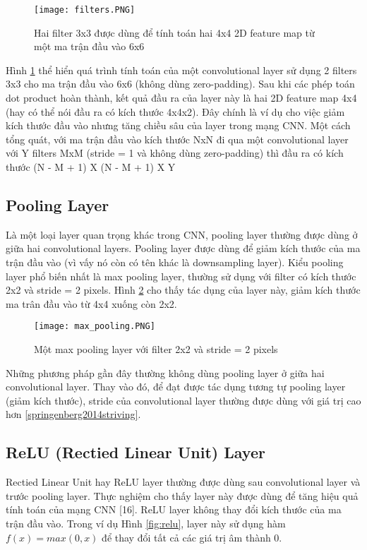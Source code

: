 \begin{figure}[h!]
	\centering
	\captionsetup{width=0.7\textwidth}
	\texttt{[image: filters.PNG]}
	\caption{Hai filter 3x3 được dùng để tính toán hai 4x4 2D feature map từ một ma trận đầu vào 6x6}
    \label{fig:filters}
\end{figure}

Hình \ref{fig:filters} thể hiển quá trình tính toán của một convolutional layer sử dụng 2 filters 3x3 cho ma trận đầu vào 6x6 (không dùng zero-padding). Sau khi các phép toán dot product hoàn thành, kết quả đầu ra của layer này là hai 2D feature map 4x4 (hay có thể nói đầu ra có kích thước 4x4x2). Đây chính là ví dụ cho việc giảm kích thước đầu vào nhưng tăng chiều sâu của layer trong mạng CNN. Một cách tổng quát, với ma trận đầu vào kích thước NxN đi qua một convolutional layer với Y filters MxM (stride = 1 và không dùng zero-padding) thì đầu ra có kích thước (N - M + 1) X (N - M + 1) X Y

\subsection*{Pooling Layer}
Là một loại layer quan trọng khác trong CNN, pooling layer thường được dùng ở giữa hai convolutional layers. Pooling layer được dùng để giảm kích thước của ma trận đầu vào (vì vấy nó còn có tên khác là downsampling layer). Kiểu pooling layer phổ biến nhất là max pooling layer, thường sử dụng với filter có kích thước 2x2 và stride = 2 pixels. Hình \ref{fig:max_pooling} cho thấy tác dụng của layer này, giảm kích thước ma trân đầu vào từ 4x4 xuống còn 2x2.

\begin{figure}[h!]
	\centering
	\captionsetup{width=0.7\textwidth}
	\texttt{[image: max\_pooling.PNG]}
	\caption{Một max pooling layer với filter 2x2 và stride = 2 pixels}
    \label{fig:max_pooling}
\end{figure}

Những phương pháp gần đây thường không dùng pooling layer ở giữa hai convolutional layer. Thay vào đó, để đạt được tác dụng tương tự pooling layer (giảm kích thước), stride của convolutional layer thường được dùng với giá trị cao hơn \ref{springenberg2014striving}.

\subsection*{ReLU (Rectied Linear Unit) Layer}
Rectied Linear Unit hay ReLU layer thường được dùng sau convolutional layer và trước pooling layer. Thực nghiệm cho thấy layer này được dùng để tăng hiệu quả tính toán của mạng CNN [16].
ReLU layer không thay đổi kích thước của ma trận đầu vào. Trong ví dụ Hình \ref{fig:relu}, layer này sử dụng hàm $f(x) = max(0, x)$ để thay đổi tất cả các giá trị âm thành 0.

